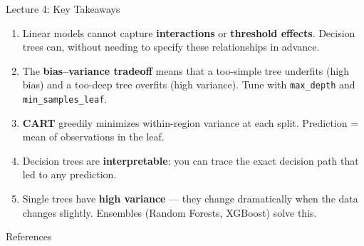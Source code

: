 \documentclass[aspectratio=169, 11pt]{beamer}
\begin{document}
\begin{frame}{Lecture 4: Key Takeaways}
  \begin{keybox}
    {\small
    \begin{enumerate}
      \item Linear models cannot capture \textbf{interactions} or
            \textbf{threshold effects}. Decision trees can, without
            needing to specify these relationships in advance.

      \item The \textbf{bias--variance tradeoff} means that a
            too-simple tree underfits (high bias) and a too-deep tree
            overfits (high variance). Tune with \texttt{max\_depth}
            and \texttt{min\_samples\_leaf}.

      \item \textbf{CART} greedily minimizes within-region variance at
            each split. Prediction = mean of observations in the leaf.

      \item Decision trees are \textbf{interpretable}: you can trace
            the exact decision path that led to any prediction.

      \item Single trees have \textbf{high variance} --- they change
            dramatically when the data changes slightly.
            Ensembles (Random Forests, XGBoost) solve this.
    \end{enumerate}
    }
  \end{keybox}
\end{frame}

\begin{frame}[allowframebreaks]{References}
  \printbibliography[heading=none]
\end{frame}

\end{document}
